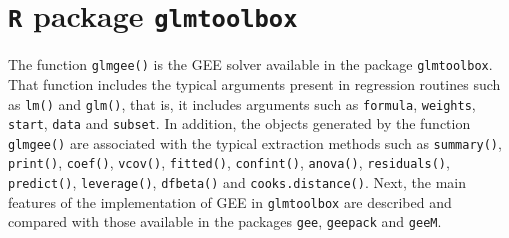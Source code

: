 \section{{\tt R} package {\tt glmtoolbox}}
The function {\tt glmgee()} is the GEE solver available in the package {\tt glmtoolbox}. That function includes the typical arguments present in regression routines such as {\tt lm()} and {\tt glm()}, that is, it includes arguments such as {\tt formula}, {\tt weights}, {\tt start}, {\tt data} and {\tt subset}. In addition, the objects generated by the function {\tt glmgee()} are associated with the typical extraction methods such as {\tt summary()}, {\tt print()}, {\tt coef()}, {\tt vcov()}, {\tt fitted()}, {\tt confint()}, {\tt anova()}, {\tt residuals()}, {\tt predict()}, {\tt leverage()}, {\tt dfbeta()} and {\tt cooks.distance()}. Next, the main features of the implementation of GEE in {\tt glmtoolbox} are des\-cri\-bed and compared with those available in the packages {\tt gee}, {\tt geepack} and {\tt geeM}.

